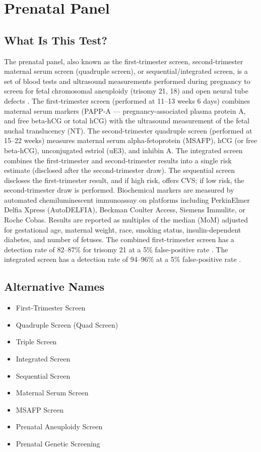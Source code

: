 \chapter{Prenatal Panel}

\section*{What Is This Test?}
The prenatal panel, also known as the first-trimester screen, second-trimester maternal serum screen (quadruple screen), or sequential/integrated screen, is a set of blood tests and ultrasound measurements performed during pregnancy to screen for fetal chromosomal aneuploidy (trisomy 21, 18) and open neural tube defects \cite{acog2020screening}. The first-trimester screen (performed at 11--13 weeks 6 days) combines maternal serum markers (PAPP-A --- pregnancy-associated plasma protein A, and free beta-hCG or total hCG) with the ultrasound measurement of the fetal nuchal translucency (NT). The second-trimester quadruple screen (performed at 15--22 weeks) measures maternal serum alpha-fetoprotein (MSAFP), hCG (or free beta-hCG), unconjugated estriol (uE3), and inhibin A. The integrated screen combines the first-trimester and second-trimester results into a single risk estimate (disclosed after the second-trimester draw). The sequential screen discloses the first-trimester result, and if high risk, offers CVS; if low risk, the second-trimester draw is performed. Biochemical markers are measured by automated chemiluminescent immunoassay on platforms including PerkinElmer Delfia Xpress (AutoDELFIA), Beckman Coulter Access, Siemens Immulite, or Roche Cobas. Results are reported as multiples of the median (MoM) adjusted for gestational age, maternal weight, race, smoking status, insulin-dependent diabetes, and number of fetuses. The combined first-trimester screen has a detection rate of 82--87\% for trisomy 21 at a 5\% false-positive rate \cite{malone2005first}. The integrated screen has a detection rate of 94--96\% at a 5\% false-positive rate \cite{wald2003suruss}.

\section*{Alternative Names}
\begin{itemize}
  \item First-Trimester Screen
  \item Quadruple Screen (Quad Screen)
  \item Triple Screen
  \item Integrated Screen
  \item Sequential Screen
  \item Maternal Serum Screen
  \item MSAFP Screen
  \item Prenatal Aneuploidy Screen
  \item Prenatal Genetic Screening
\end{itemize}
